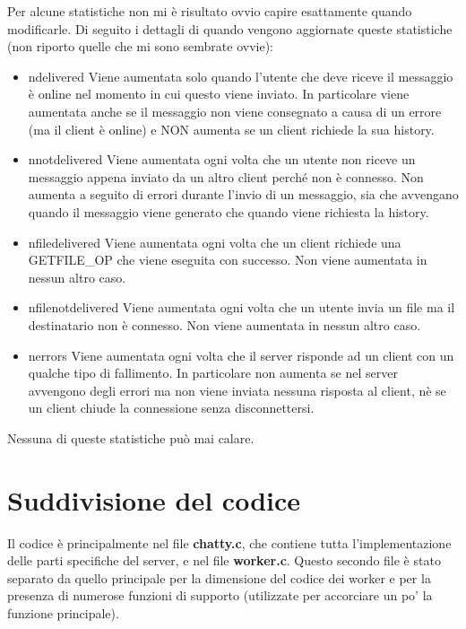 \documentclass[a4paper]{article}
\theoremstyle{theorem}
\theoremstyle{remark}
\theoremstyle{definition}
\theoremstyle{corollary}
\theoremstyle{lemma}
\newcommand\file[1]{%
	\textbf{#1}}
\begin{document}
Per alcune statistiche non mi è risultato ovvio capire esattamente quando modificarle. Di seguito i dettagli di quando vengono aggiornate queste statistiche (non riporto quelle che mi sono sembrate ovvie):
\begin{itemize}
	\item{ndelivered} Viene aumentata solo quando l'utente che deve riceve il messaggio è online nel momento in cui questo viene inviato. In particolare viene aumentata anche se il messaggio non viene consegnato a causa di un errore (ma il client è online) e NON aumenta se un client richiede la sua history.
	\item{nnotdelivered} Viene aumentata ogni volta che un utente non riceve un messaggio appena inviato da un altro client perché non è connesso. Non aumenta a seguito di errori durante l'invio di un messaggio, sia che avvengano quando il messaggio viene generato che quando viene richiesta la history.
	\item{nfiledelivered} Viene aumentata ogni volta che un client richiede una GETFILE\_OP che viene eseguita con successo. Non viene aumentata in nessun altro caso.
	\item{nfilenotdelivered} Viene aumentata ogni volta che un utente invia un file ma il destinatario non è connesso. Non viene aumentata in nessun altro caso.
	\item{nerrors} Viene aumentata ogni volta che il server risponde ad un client con un qualche tipo di fallimento. In particolare non aumenta se nel server avvengono degli errori ma non viene inviata nessuna risposta al client, nè se un client chiude la connessione senza disconnettersi.
\end{itemize}
Nessuna di queste statistiche può mai calare.


\section{Suddivisione del codice}
Il codice è principalmente nel file \file{chatty.c}, che contiene tutta l'implementazione delle parti specifiche del server, e nel file \file{worker.c}. Questo secondo file è stato separato da quello principale per la dimensione del codice dei worker e per la presenza di numerose funzioni di supporto (utilizzate per accorciare un po' la funzione principale).
\end{document}
